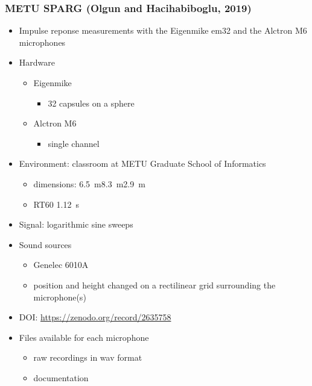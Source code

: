 \documentclass[14pt, oneside]{extarticle}
\begin{document}
\subsubsection{METU SPARG (Olgun and Hacihabiboglu, 2019)}

\begin{itemize}

\item Impulse reponse measurements with the Eigenmike em32 and the Alctron M6 microphones \cite{olgun2019metu}

\item Hardware
	\begin{itemize}
	\item Eigenmike
		\begin{itemize}
		\item 32 capsules on a sphere
		\end{itemize}
	\item Alctron M6
		\begin{itemize}
		\item single channel	
		\end{itemize}
	\end{itemize}

\item Environment: classroom at METU Graduate School of Informatics
	\begin{itemize}
	\item dimensions: \SI{6.5}{\metre}\texttimes\SI{8.3}{\metre}\texttimes\SI{2.9}{\metre}
	\item RT60 \SI{1.12}{\second} 
	\end{itemize}

\item Signal: logarithmic sine sweeps

\item Sound sources
	\begin{itemize}
	\item Genelec 6010A
	\item position and height changed on a rectilinear grid surrounding the microphone(s)
	\end{itemize}

\item DOI: \href{10.5281/zenodo.2635758}{https://zenodo.org/record/2635758} 

\item Files available for each microphone
	\begin{itemize}
	\item raw recordings in wav format
	\item documentation
	\end{itemize}

\end{itemize}
\end{document}
